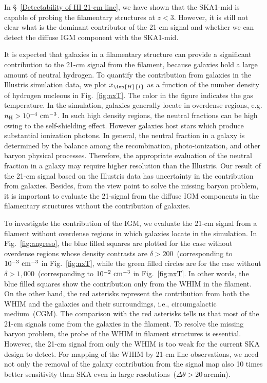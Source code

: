\documentclass[a4paper,fleqn,usenatbib,useAMS]{mnras}
\begin{document}
In \S~\ref{Detectability of HI 21-cm line}, we have shown that the SKA1-mid is capable of probing the filamentary structures at $z<3$. 
However, it is still not clear what is the dominant contributor of the 21-cm signal and whether we can detect the diffuse IGM component with the SKA1-mid. 

It is expected that galaxies in a filamentary structure can provide a significant contribution to the 21-cm signal from the filament, because galaxies hold a large amount of neutral hydrogen.
To quantify the contribution from galaxies in the Illustris simulation data, we plot $x_{\ion{H}{I}}$ as a function of the number density of hydrogen nucleous in Fig.~\ref{fig:nxT}. 
The color in the figure indicates the gas temperature. 
In the simulation, galaxies generally locate in overdense regions, e.g. $n_{\rm H}>10^{-4}~{\rm cm^{-3}}$.
In such high density regions, the neutral fractions can be high owing to the self-shielding effect. However galaxies host stars which produce substantial ionization
photons. 
In general, the neutral fraction in a galaxy is determined by the balance
among the recombination, photo-ionization, and other baryon physical processes.
Therefore, the appropriate evaluation of the neutral fraction in a galaxy may require higher resolution than the Illustris. 
Our result of the 21-cm signal based on the Illustris data has
uncertainty in the contribution from galaxies.
Besides, from the view point to solve the missing baryon problem, it is important to evaluate the 21-signal from the diffuse IGM components in the filamentary structures without the contribution of galaxies. 

To investigate the contribution of the IGM, we evaluate the 21-cm signal from a filament without overdense regions in which galaxies locate in the simulation. 
In Fig.~\ref{fig:angreso}, the blue filled squares are plotted for the case without overdense regions whose 
density contrasts are $\delta>200$~(corresponding to $10^{-3}~\rm
cm^{-3}$ in Fig.~\ref{fig:nxT},
while the green filled circles are for the case
without $\delta >1,000$~(corresponding to $10^{-2}~\rm
cm^{-3}$ in Fig.~\ref{fig:nxT}.
In other words, the blue filled squares show the contribution only from the WHIM in
the filament. 
On the other hand, the red asterisks represent the contribution from both the WHIM and the galaxies and their surroundings, i.e., circumgalactic medium~(CGM).
The comparison with the red asterisks tells us that
most of the 21-cm signals come from the galaxies in the filament.
To resolve the missing baryon problem, the probe of the WHIM in filament structures
is essential. 
However, the 21-cm signal from only the WHIM is too weak for the current SKA design
to detect.
For mapping of the WHIM by 21-cm line observations,
we need not only the removal of the galaxy contribution from the signal map also 10 times better sensitivity than SKA even in large resolutions~($\Delta \theta >20~$arcmin). 
\end{document}

